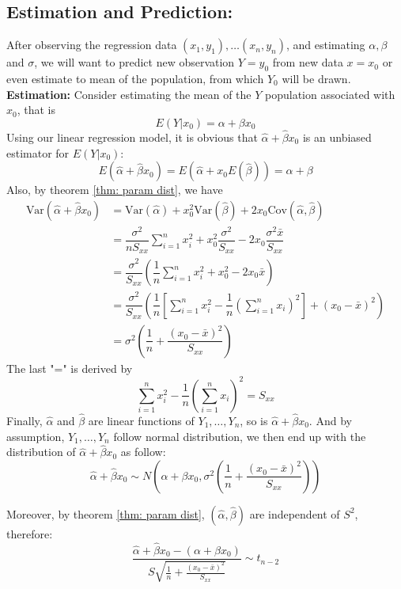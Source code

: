 \documentclass[11pt]{article}
\begin{document}
\subsection{Estimation and Prediction: }
After observing the regression data $(x_1, y_1), \dots (x_n, y_n) $, and estimating $\alpha, \beta$ and $\sigma$, we will want to predict new observation $Y = y_0$ from new data $x= x_0$ or even estimate to mean of the population, from which $Y_0$ will be drawn. 
\textbf{Estimation: } Consider estimating the mean of the $Y$ population associated with $x_0$, that is
$$E(Y|x_0) = \alpha + \beta x_0 $$
Using our linear regression model, it is obvious that $\hat{\alpha} + \hat{\beta} x_0$ is an unbiased estimator for $E(Y|x_0)$:
$$E(\hat{\alpha} + \hat{\beta} x_0 ) = E(\hat{\alpha} + x_0 E(\hat{\beta})) = \alpha + \beta $$
Also, by theorem \ref{thm: param dist}, we have
\begin{align*}
	\text{Var}(\hat{\alpha} + \hat{\beta} x_0) & =  \text{Var}(\hat{\alpha}) + x_0^2 \text{Var}(\hat{\beta}) + 2x_0 \text{Cov}(\hat{\alpha}, \hat{\beta})\\
		&=   \dfrac{\sigma^2}{n S_{xx}}  \sum_{i = 1}^n x_i^2 + x_0^2 \dfrac{\sigma^2}{S_{xx}} - 2x_0  \dfrac{\sigma^2\bar{x}}{S_{xx}}  \\
		& = \dfrac{\sigma^2}{S_{xx}}  \left(   \dfrac{1}{n} \sum_{i = 1}^n x_i^2 + x_0^2 - 2x_0 \bar{x}
		   \right) \\
		   & = \dfrac{\sigma^2}{S_{xx}} \left( \dfrac{1}{n} \left[  \sum_{i = 1}^n x_i^2 - \dfrac{1}{n} \left(\sum_{i = 1}^n x_i\right)^2  \right] + (x_0 - \bar{x})^2
		   \right) \\
		   & = \sigma^2 \left( \dfrac{1}{n} + \dfrac{(x_0 - \bar{x})^2}{S_{xx}}\right)
\end{align*}
The last "=" is derived by 
$$  \sum_{i = 1}^n x_i^2 - \dfrac{1}{n} \left(\sum_{i = 1}^n x_i\right)^2  = S_{xx}$$
Finally, $\hat{\alpha}$ and $\hat{\beta}$ are linear functions of $Y_1, \dots, Y_n$, so is $\hat{\alpha} + \hat{\beta} x_0$. And by assumption, $Y_1, \dots, Y_n$ follow normal distribution, we then end up with the distribution of $\hat{\alpha} + \hat{\beta} x_0$ as follow: 
$$\hat{\alpha} + \hat{\beta} x_0 \sim N \left(\alpha + \beta x_0, \sigma^2 \left(\dfrac{1}{n} + \dfrac{(x_0 - \bar{x})^2}{S_{xx}}\right)\right) $$

Moreover, by theorem \ref{thm: param dist}, $(\hat{\alpha}, \hat{\beta})$ are independent of $S^2$, therefore:
$$\dfrac{\hat{\alpha} + \hat{\beta} x_0 - (\alpha +\beta x_0)}{S\sqrt{\frac{1}{n} + \frac{(x_0 - \bar{x})^2}{S_{xx}}}} \sim t_{n - 2} $$
\end{document}
